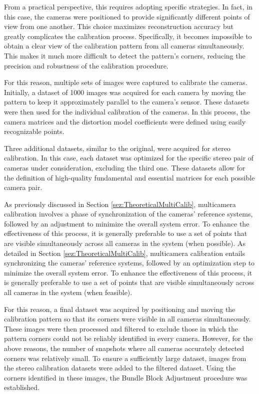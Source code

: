 From a practical perspective, this requires adopting specific strategies. In fact, in this case, the cameras were positioned to provide significantly different points of view from one another. This choice maximizes reconstruction accuracy but greatly complicates the calibration process. Specifically, it becomes impossible to obtain a clear view of the calibration pattern from all cameras simultaneously. This makes it much more difficult to detect the pattern's corners, reducing the precision and robustness of the calibration procedure.

For this reason, multiple sets of images were captured to calibrate the cameras. Initially, a dataset of 1000 images was acquired for each camera by moving the pattern to keep it approximately parallel to the camera's sensor. These datasets were then used for the individual calibration of the cameras. In this process, the camera matrices and the distortion model coefficients were defined using easily recognizable points.

Three additional datasets, similar to the original, were acquired for stereo calibration. In this case, each dataset was optimized for the specific stereo pair of cameras under consideration, excluding the third one. 
These datasets allow for the definition of high-quality fundamental and essential matrices for each possible camera pair.

As previously discussed in Section \ref{sez:TheoreticalMultiCalib}, multicamera calibration involves a phase of synchronization of the cameras' reference systems, followed by an adjustment to minimize the overall system error. 
To enhance the effectiveness of this process, it is generally preferable to use a set of points that are visible simultaneously across all cameras in the system (when possible).
As detailed in Section \ref{sez:TheoreticalMultiCalib}, multicamera calibration entails synchronizing the cameras' reference systems, followed by an optimization step to minimize the overall system error. To enhance the effectiveness of this process, it is generally preferable to use a set of points that are visible simultaneously across all cameras in the system (when feasible).

For this reason, a final dataset was acquired by positioning and moving the calibration pattern so that its corners were visible in all cameras simultaneously. These images were then processed and filtered to exclude those in which the pattern corners could not be reliably identified in every camera. However, for the above reasons, the number of snapshots where all cameras accurately detected corners was relatively small.
To ensure a sufficiently large dataset, images from the stereo calibration datasets were added to the filtered dataset. Using the corners identified in these images, the Bundle Block Adjustment procedure was established.

